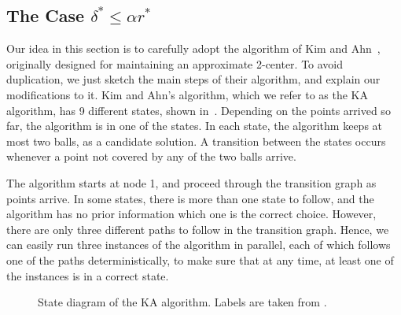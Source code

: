 \documentclass[envcountsame]{cls/cccg15}
\newcommand{\lee}{\leqslant}
\renewcommand{\leq}{\lee}
\begin{document}

\subsection{The Case $\delta^* \leq \alpha r^*$}
\label{subsec:smaller}

Our idea in this section is to carefully adopt
the algorithm of Kim and Ahn~\cite{kim2014improved},
originally designed for maintaining an approximate 2-center.
To avoid duplication, we just sketch the main steps of their algorithm,
and explain our modifications to it. 
Kim and Ahn's algorithm, which we refer to as the KA algorithm,
has 9 different states, shown in~.
Depending on the points arrived so far, the algorithm is in one of the states.
In each state, the algorithm keeps at most two balls, as a candidate solution. 
A transition between the states occurs whenever a point not covered by any of the two balls arrive. 

The algorithm starts at node 1, and proceed through the transition graph as points arrive.
In some states, there is more than one state to follow,
and the algorithm has no prior information which one is the correct choice.
However, there are only three different paths to follow in the transition graph. 
Hence, we can easily run three instances of the algorithm in parallel,
each of which follows one of the paths deterministically, 
to make sure that at any time, at least one of the instances is in a correct state.

\begin{figure}
\centering
{}
\caption{State diagram of the KA algorithm.
Labels are taken from \cite{kim2014improved}.}
\label{fig:dag}
\end{figure}
\end{document}

